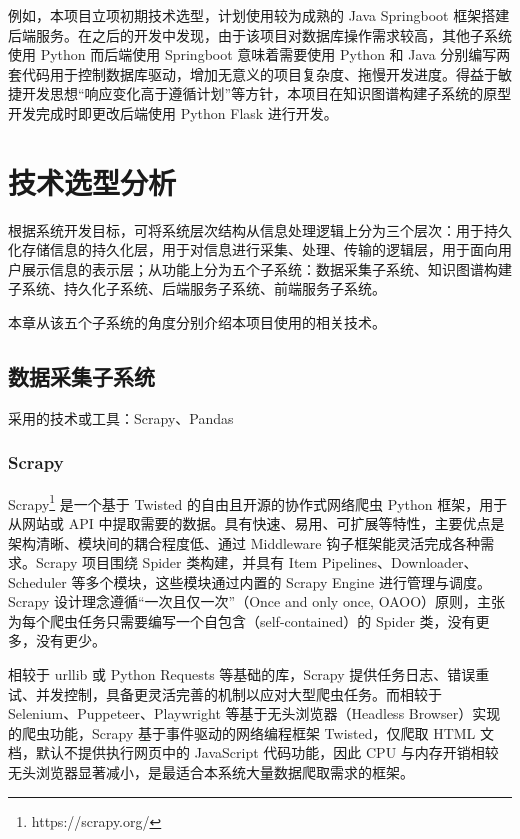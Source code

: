 \documentclass[a4paper,AutoFakeBold,oneside,12pt]{book}
\begin{document}
例如，本项目立项初期技术选型，计划使用较为成熟的 Java Springboot 框架搭建后端服务。在之后的开发中发现，由于该项目对数据库操作需求较高，其他子系统使用 Python 而后端使用 Springboot 意味着需要使用 Python 和 Java 分别编写两套代码用于控制数据库驱动，增加无意义的项目复杂度、拖慢开发进度。得益于敏捷开发思想“响应变化高于遵循计划”等方针，本项目在知识图谱构建子系统的原型开发完成时即更改后端使用 Python Flask 进行开发。

\chapter{技术选型分析}

根据系统开发目标，可将系统层次结构从信息处理逻辑上分为三个层次：用于持久化存储信息的持久化层，用于对信息进行采集、处理、传输的逻辑层，用于面向用户展示信息的表示层；从功能上分为五个子系统：数据采集子系统、知识图谱构建子系统、持久化子系统、后端服务子系统、前端服务子系统。

本章从该五个子系统的角度分别介绍本项目使用的相关技术。

\section{数据采集子系统}

采用的技术或工具：Scrapy、Pandas

\subsection{Scrapy}

Scrapy\footnote{https://scrapy.org/} 是一个基于 Twisted 的自由且开源的协作式网络爬虫 Python 框架，用于从网站或 API 中提取需要的数据。具有快速、易用、可扩展等特性，主要优点是架构清晰、模块间的耦合程度低、通过 Middleware 钩子框架能灵活完成各种需求。Scrapy 项目围绕 Spider 类构建，并具有 Item Pipelines、Downloader、Scheduler 等多个模块，这些模块通过内置的 Scrapy Engine 进行管理与调度。Scrapy 设计理念遵循“一次且仅一次”（Once and only once, OAOO）原则，主张为每个爬虫任务只需要编写一个自包含（self-contained）的 Spider 类，没有更多，没有更少。

相较于 urllib 或 Python Requests 等基础的库，Scrapy 提供任务日志、错误重试、并发控制，具备更灵活完善的机制以应对大型爬虫任务。而相较于 Selenium、Puppeteer、Playwright 等基于无头浏览器（Headless Browser）实现的爬虫功能，Scrapy 基于事件驱动的网络编程框架 Twisted，仅爬取 HTML 文档，默认不提供执行网页中的 JavaScript 代码功能，因此 CPU 与内存开销相较无头浏览器显著减小，是最适合本系统大量数据爬取需求的框架。
\end{document}
